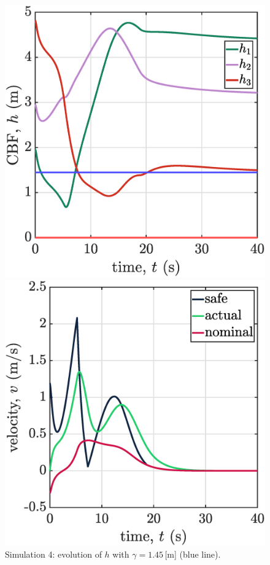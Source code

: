 \begin{figure}[!ht]
\begin{minipage}[b]{0.46\linewidth}
    \includegraphics[width=\textwidth]{figures/sim4h.eps}
    \caption{\label{fig:sim4h}Simulation 4: evolution of $h$ with $\gamma = 1.45\,[\mathrm{m}$] (blue line).}
    \end{minipage}   
\begin{minipage}[t]{.45\textwidth}
        \centering
        \includegraphics[width=\textwidth]{figures/sim4v1.eps}

\end{minipage}
\end{figure}
